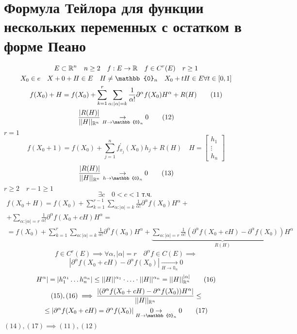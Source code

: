 \documentclass[main]{subfiles}
\begin{document}
\section{Формула Тейлора для функции нескольких переменных с остатком в форме Пеано}

\begin{gather*}
    E \subset \vR^n \quad n \geq 2 \quad f: E \rightarrow \vR \quad f \in C^r(E) \quad r \geq 1 \\
    X_0 \in e \quad X+0 + H \in E \quad H \ne \mathbb{0}_n  \quad X_0 + tH \in E \forall t \in [0,1] \\
    f(X_0) + H = f(X_0) + \sum^r_{k=1} \sum_{\alpha: |\alpha| = k} \frac{1}{\alpha!} \partial^\alpha f (X_0) H^\alpha + R(H) \tag{11}\\
    \frac{|R(H)|}{||H||_{\vR^n}} \underset{H \to \mathbb{0}_n}{\rightarrow} 0 \tag{12} \\
\end{gather*}
$r=1$
\[ f(X_0+1) = f(X_0) + \sum^n_{j=1} f^\prime_{x_j}(X_0)h_j + R(H) \quad H = \begin{bmatrix}
    h_1 \\
    \vdots \\
    h_n
\end{bmatrix} \tag{13\prime}\]
\[\frac{|R(H)|}{||H||_{\vR^n}} \underset{h \to \mathbb{0}_n}{\rightarrow} 0 \tag{13} \]
$r \geq 2 \quad r - 1 \geq 1 $
    \[\exists c \quad 0  < c < 1 \text{ т.ч. } \]
    \begin{multline*}
        f(X_0+H) = f(X_0) + \sum^{r-1}_{k=1}\sum_{\alpha: |\alpha| = k} \frac{1}{\alpha!} \partial^\alpha f(X_0)H^\alpha + \\
        + \sum_{\alpha: |\alpha| = r} \frac{1}{\alpha!} \partial^\alpha f(X_0 + cH) H^\alpha = \\
        = f(X_0) + \sum_{k=1}^r \sum_{\alpha: |\alpha| = k} \frac{1}{\alpha!} \partial^\alpha f(X_0) H^\alpha + 
        \underbrace{\sum_{\alpha: |\alpha|=r} \frac{1}{\alpha!}(\partial^\alpha f(X_0 + cH) - \partial^\alpha f(X_0))H^\alpha}_{R(H)} \tag{14} 
    \end{multline*}
    \[f \in C^r(E) \implies \forall \alpha, |\alpha| = r \quad \partial^\alpha f \in C(E) \implies \] 
    \[ |\partial^\alpha f(X_0 + cH) - \partial^\alpha f(X_0)| \underset{H \to \mathbb{0}_n}{\rightarrow} 0  \tag{15} \]
    \[H^\alpha| = |h_1^{\alpha_1} \ldots h_n^{\alpha_n}| \leq ||H||^{\alpha_1} \cdot \ldots \cdot ||H||^{\alpha_n} = ||H||^{|\alpha|}_{\mathbb{R}^n} \tag{16} \]
    \begin{multline*}
        (15), (16) \implies \frac{|(\partial^\alpha f (X_0 + cH) - \partial^\alpha f(X_0))H^\alpha|}{||H||_{\vR^n}} \leq \\
    \leq |\partial^\alpha f(X_0 + cH) = \partial^\alpha f(X_0)| \underset{H \to \mathbb{0}_n}{0\rightarrow}  0 \tag{17}
    \end{multline*}
    $(14), (17) \implies (11), (12) $
\end{document}

